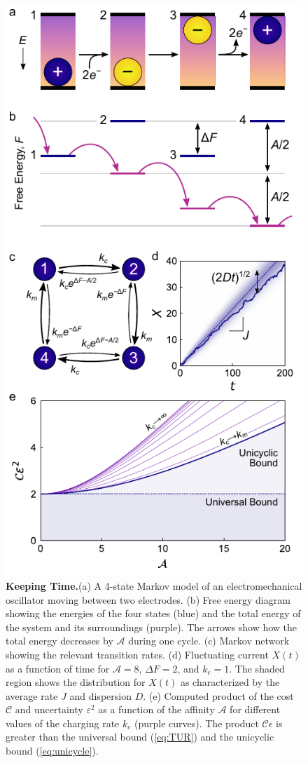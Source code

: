 \begin{appendices}
\begin{figure}[p!]
    \centering
    \includegraphics{figures/A5_KeepingTime.pdf}
    \caption{\textbf{Keeping Time.}(a) A 4-state Markov model of an electromechanical oscillator moving between two electrodes. (b) Free energy diagram showing the energies of the four states (blue) and the total energy of the system and its surroundings (purple). The arrows show how the total energy decreases by $\mathcal{A}$ during one cycle. (c) Markov network showing the relevant transition rates. (d) Fluctuating current $X(t)$ as a function of time for $\mathcal{A}=8$, $\Delta F=2$, and $k_c= 1$.  The shaded region shows the distribution for $X(t)$ as characterized by the average rate $J$ and dispersion $D$. (e) Computed product of the cost $\mathcal{C}$ and uncertainty $\varepsilon^2$ as a function of the affinity $\mathcal{A}$ for different values of the charging rate $k_c$ (purple curves).  The product $\mathcal{C}\epsilon$ is greater than the universal bound (\ref{eq:TUR}) and the unicyclic bound (\ref{eq:unicycle}). }

\end{figure}
\end{appendices}
